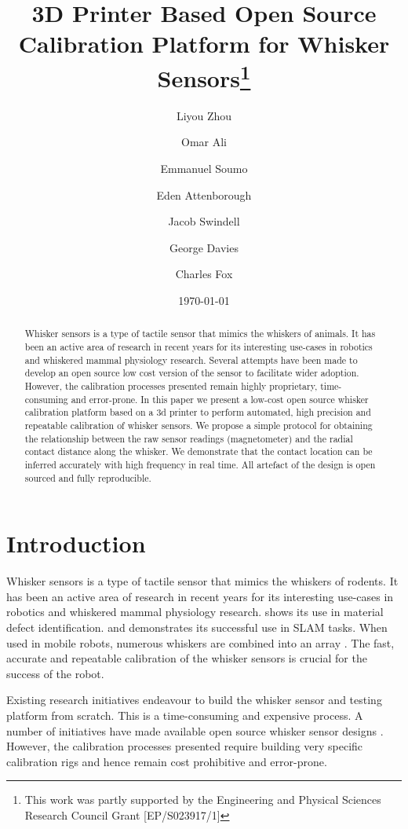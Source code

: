\documentclass[runningheads]{llncs}
\title{3D Printer Based Open Source Calibration Platform for Whisker Sensors\thanks{This work was partly supported by the Engineering and Physical Sciences
Research Council Grant [EP/S023917/1]}}
\author{
    Liyou Zhou\orcidID{0009-0005-9491-9003} \and
    Omar Ali \and
    Emmanuel Soumo \and
    Eden Attenborough \and
    Jacob Swindell \and
    George Davies \and
    Charles Fox
}
\institute{School of Computer Science, University of Lincoln, Lincoln, UK}
\date{\today}
\begin{document}
\maketitle

\begin{abstract}
Whisker sensors is a type of tactile sensor that mimics the whiskers of animals. It has been an active area of research in recent years for its interesting use-cases in robotics and whiskered mammal physiology research. Several attempts have been made to develop an open source low cost version of the sensor to facilitate wider adoption. However, the calibration processes presented remain highly proprietary, time-consuming and error-prone. In this paper we present a low-cost open source whisker calibration platform based on a 3d printer to perform automated, high precision and repeatable calibration of whisker sensors. We propose a simple protocol for obtaining the relationship between the raw sensor readings (magnetometer) and the radial contact distance along the whisker. We demonstrate that the contact location can be inferred accurately with high frequency in real time. All artefact of the design is open sourced and fully reproducible.
\end{abstract}

\section{Introduction}

Whisker sensors is a type of tactile sensor that mimics the whiskers of rodents. It has been an active area of research in recent years for its interesting use-cases in robotics and whiskered mammal physiology research\cite{prescottActiveTouchSensing2020}. \cite{fotouhiDetectionBarelyVisible2021} shows its use in material defect identification. \cite{struckmeierViTaSLAMBioinspiredVisuoTactile2019} and \cite{foxTactileSLAMBiomimetic2012} demonstrates its successful use in SLAM tasks. When used in mobile robots, numerous whiskers are combined into an array \cite{leporaNaiveBayesNovelty2010} \cite{pearsonSimultaneousLocalisationMapping2013}. The fast, accurate and repeatable calibration of the whisker sensors is crucial for the success of the robot.

Existing research initiatives endeavour to build the whisker sensor and testing platform from scratch. This is a time-consuming and expensive process. A number of initiatives have made available open source whisker sensor designs \cite{FoRGroup1OpenWhisker2024} \cite{RatatouilleWhiskersOpenWhiskerOpen}. However, the calibration processes presented require building very specific calibration rigs and hence remain cost prohibitive and error-prone. 
\end{document}
